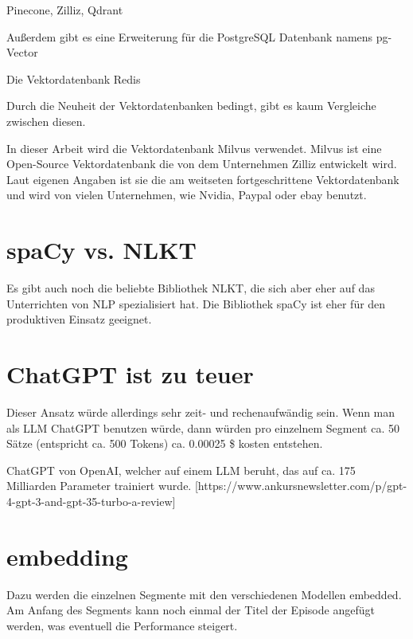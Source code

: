 Pinecone, Zilliz, Qdrant

Außerdem gibt es eine Erweiterung für die PostgreSQL Datenbank namens pg-Vector

Die Vektordatenbank Redis

Durch die Neuheit der Vektordatenbanken bedingt, gibt es kaum Vergleiche zwischen diesen.
\cite{blueteamai}


In dieser Arbeit wird die Vektordatenbank Milvus verwendet.
Milvus ist eine Open-Source Vektordatenbank die von dem Unternehmen Zilliz entwickelt wird.
Laut eigenen Angaben ist sie die am weitseten fortgeschrittene Vektordatenbank und wird von vielen Unternehmen, wie Nvidia, Paypal oder ebay benutzt.

\section{spaCy vs. NLKT}

Es gibt auch noch die beliebte Bibliothek NLKT, die sich aber eher auf das Unterrichten von NLP spezialisiert hat.
Die Bibliothek spaCy ist eher für den produktiven Einsatz geeignet.

\section{ChatGPT ist zu teuer}

Dieser Ansatz würde allerdings sehr zeit- und rechenaufwändig sein.
Wenn man als LLM ChatGPT benutzen würde, dann würden pro einzelnem Segment ca. 50 Sätze (entspricht ca. 500 Tokens) ca. 0.00025 \$ kosten entstehen.

ChatGPT von OpenAI, welcher auf einem LLM beruht, das auf ca. 175 Milliarden Parameter trainiert wurde. [https://www.ankursnewsletter.com/p/gpt-4-gpt-3-and-gpt-35-turbo-a-review]

\section{embedding}
Dazu werden die einzelnen Segmente mit den verschiedenen Modellen embedded.
Am Anfang des Segments kann noch einmal der Titel der Episode angefügt werden, was eventuell die Performance steigert.\cite{jones2021}
